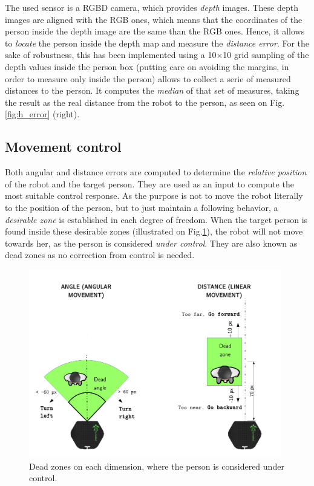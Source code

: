 The used sensor is a RGBD camera, which provides \emph{depth} images. These depth images are aligned with the RGB ones, which means that the coordinates of the person inside the depth image are the same than the RGB ones. Hence, it allows to \emph{locate} the person inside the depth map and measure the \emph{distance error}. For the sake of robustness, this has been implemented using a 10$\times$10 grid sampling of the depth values inside the person box (putting care on avoiding the margins, in order to measure only inside the person) allows to collect a serie of measured distances to the person. It computes the \emph{median} of that set of measures, taking the result as the real distance from the robot to the person, as seen on Fig. \ref{fig:h_error} (right). 

\subsection{Movement control}

Both angular and distance errors are computed to determine the \emph{relative position} of the robot and the target person. They are used as an input to compute the most suitable control response. As the purpose is not to move the robot literally to the position of the person, but to just maintain a following behavior, a \emph{desirable zone} is established in each degree of freedom. When the target person is found inside these desirable zones (illustrated on Fig.\ref{fig:dead_zones}), the robot will not move towards her, as the person is considered \emph{under control}. They are also known as dead zones as no correction from control is needed. 

\begin{figure}[h]
	\centering
	\includegraphics[width=11cm]{images/dead_zones}
	\caption{Dead zones on each dimension, where the person is considered under control.}
	\label{fig:dead_zones}
\end{figure}


